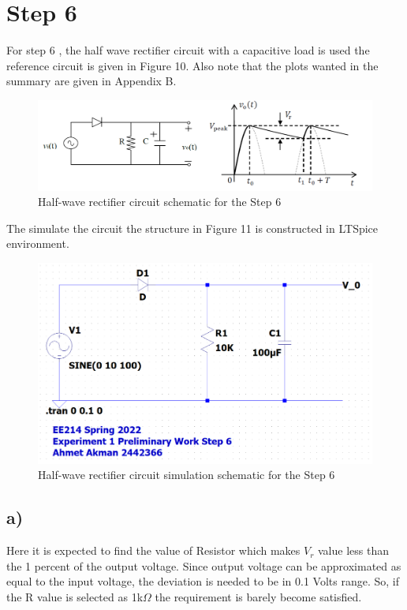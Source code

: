 \documentclass[letterpaper,12pt]{article}
\begin{document}
\section{Step 6}
For step 6 , the half wave rectifier circuit with a capacitive load is used the reference circuit is given in Figure 10. Also note that the plots wanted in the summary are given in Appendix B.
\begin{figure}[H]
    \centering
   \includegraphics[width=1\textwidth]{6_1.png}
   \caption{Half-wave rectifier circuit schematic for the Step 6}
\end{figure} 
The simulate the circuit the structure in Figure 11 is constructed in LTSpice environment.

\begin{figure}[H]
    \centering
   \includegraphics[width=1\textwidth]{6SCH.png}
   \caption{Half-wave rectifier circuit simulation schematic for the Step 6}
\end{figure} 



\subsection{a)}
Here it is expected to find the value of Resistor which makes \(V_r\) value less than the 1 percent of the output voltage. Since output voltage can be approximated as equal to the input voltage, the deviation is needed to be in 0.1 Volts range. So, if the R value is selected as 1k\(\Omega\)  the requirement is barely become satisfied. 
\end{document}
